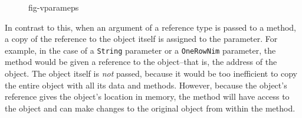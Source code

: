 
\begin{figure}[b!]
{fig-vparameps}
\end{figure}
\noindent In contrast to this, when an argument of a reference type
is passed to a method, a copy of the reference to the object itself is
assigned to the parameter. For example, in the case of a {\tt String}
parameter or a {\tt OneRowNim} parameter, the method would be given a
reference to the object--that is, the address of the object. The
object itself is {\it not} passed, because it would be too inefficient
to copy the entire object with all its data and methods.  However,
because the object's reference gives the object's location in memory,
the method will have access to the object and can make changes to the
original object from within the method.



